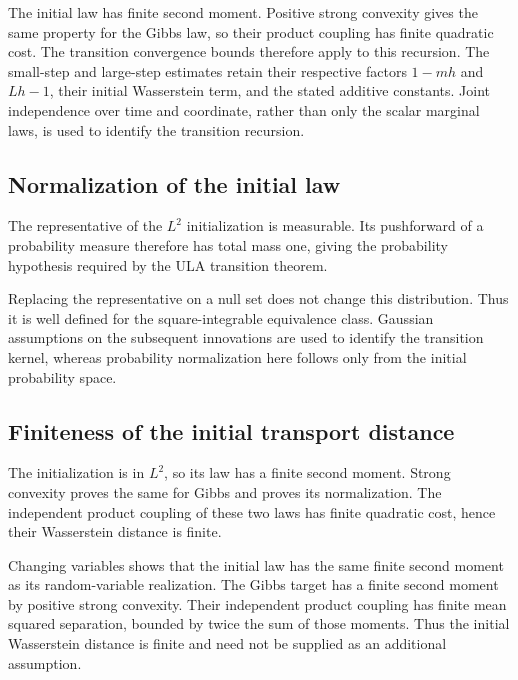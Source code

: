 \documentclass[11pt,a4paper]{article}
\begin{document}
The initial law has finite second moment. Positive strong convexity gives the same property for the Gibbs law, so their product coupling has finite quadratic cost. The transition convergence bounds therefore apply to this recursion. The small-step and large-step estimates retain their respective factors \(1-mh\) and \(Lh-1\), their initial Wasserstein term, and the stated additive constants. Joint independence over time and coordinate, rather than only the scalar marginal laws, is used to identify the transition recursion.


\subsection{\texorpdfstring{Normalization of the initial law}{Normalization of the initial law}}


The representative of the \(L^2\) initialization is measurable. Its pushforward of a probability measure therefore has total mass one, giving the probability hypothesis required by the ULA transition theorem.



Replacing the representative on a null set does not change this distribution. Thus it is well defined for the square-integrable equivalence class. Gaussian assumptions on the subsequent innovations are used to identify the transition kernel, whereas probability normalization here follows only from the initial probability space.


\subsection{\texorpdfstring{Finiteness of the initial transport distance}{Finiteness of the initial transport distance}}


The initialization is in \(L^2\), so its law has a finite second moment. Strong convexity proves the same for Gibbs and proves its normalization. The independent product coupling of these two laws has finite quadratic cost, hence their Wasserstein distance is finite.



Changing variables shows that the initial law has the same finite second moment as its random-variable realization. The Gibbs target has a finite second moment by positive strong convexity. Their independent product coupling has finite mean squared separation, bounded by twice the sum of those moments. Thus the initial Wasserstein distance is finite and need not be supplied as an additional assumption.
\end{document}
